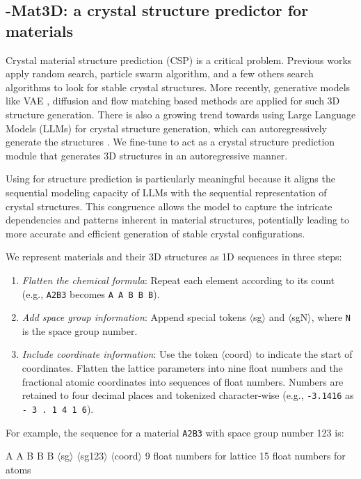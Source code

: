 \subsection{\ourM{}-Mat3D: a crystal structure predictor for materials}\label{sec:material_structure_predictor}
Crystal material structure prediction (CSP) is a critical problem. Previous works apply random search, particle swarm algorithm, and a few others search algorithms to look for stable crystal structures. More recently, generative models like VAE \cite{cdvae}, diffusion \cite{zeni2023mattergen} and flow matching based methods \cite{flowmm} are applied for such 3D structure generation.   There is also a growing trend towards using Large Language Models (LLMs) for crystal structure generation, which can autoregressively generate the structures \cite{gruver2024finetunedlanguagemodelsgenerate,antunes2024crystalstructuregenerationautoregressive,flowmm}. We fine-tune \ourM{} to act as a crystal structure prediction module that generates 3D structures in an autoregressive manner. 

Using \ourM{} for structure prediction is particularly meaningful because it aligns the sequential modeling capacity of LLMs with the sequential representation of crystal structures. This congruence allows the model to capture the intricate dependencies and patterns inherent in material structures, potentially leading to more accurate and efficient generation of stable crystal configurations.

We represent materials and their 3D structures as 1D sequences in three steps:
\begin{enumerate}
\item {\em Flatten the chemical formula}: Repeat each element according to its count (e.g., \texttt{A2B3} becomes \texttt{A A B B B}). 
\item {\em Add space group information}: Append special tokens $\langle$sg$\rangle$ and $\langle$sg{N}$\rangle$, where \texttt{N} is the space group number.
\item {\em Include coordinate information}: Use the token $\langle$coord$\rangle$ to indicate the start of coordinates. Flatten the lattice parameters into nine float numbers and the fractional atomic coordinates into sequences of float numbers. Numbers are retained to four decimal places and tokenized character-wise (e.g., \texttt{-3.1416} as \texttt{- 3 . 1 4 1 6}).%
\end{enumerate}
For example, the sequence for a material \texttt{A2B3} with space group number 123 is:
\begin{example}
A A B B B $\langle$sg$\rangle$ $\langle$sg123$\rangle$ $\langle$coord$\rangle$ {9 float numbers for lattice} {15 float numbers for atoms}
\end{example}


